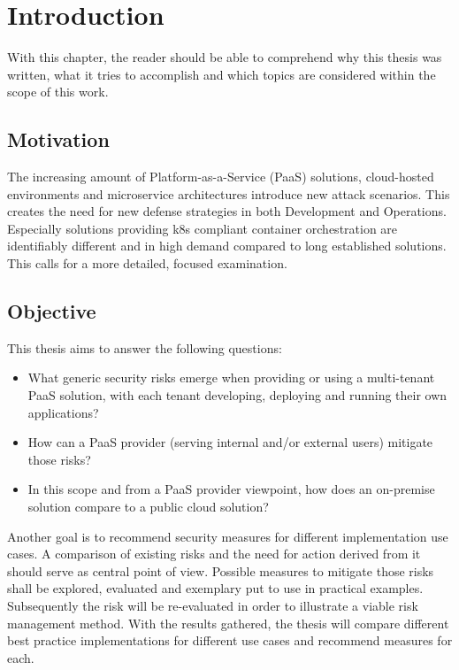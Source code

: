 \chapter{Introduction}
With this chapter, the reader should be able to comprehend why this thesis was written, 
what it tries to accomplish and which topics are considered within the scope of this work.

\section{Motivation}

The increasing amount of Platform-as-a-Service (PaaS) solutions, cloud-hosted environments and microservice architectures introduce new attack scenarios. 
This creates the need for new defense strategies in both Development and Operations. 
Especially solutions providing \gls{k8s} compliant container orchestration are identifiably different and in high demand compared to long established solutions. 
This calls for a more detailed, focused examination. 

\section{Objective}

This thesis aims to answer the following questions:

\begin{itemize}

\item What generic security risks emerge when providing or using a multi-tenant PaaS solution,
with each tenant developing, deploying and running their own applications? 

\item How can a PaaS provider (serving internal and/or external users) mitigate those risks? 

\item  In this scope and from a PaaS provider viewpoint, how does an on-premise solution compare
to a public cloud solution? 

\end{itemize}

Another goal is to recommend security measures for different implementation use cases.
A comparison of existing risks and the need for action derived from it should serve as central point of view. 
Possible measures to mitigate those risks shall be explored, evaluated and exemplary put to use in practical examples.
Subsequently the risk will be re-evaluated in order to illustrate a viable risk management method.
With the results gathered, the thesis will compare different best practice implementations for different use cases and recommend measures for each.

